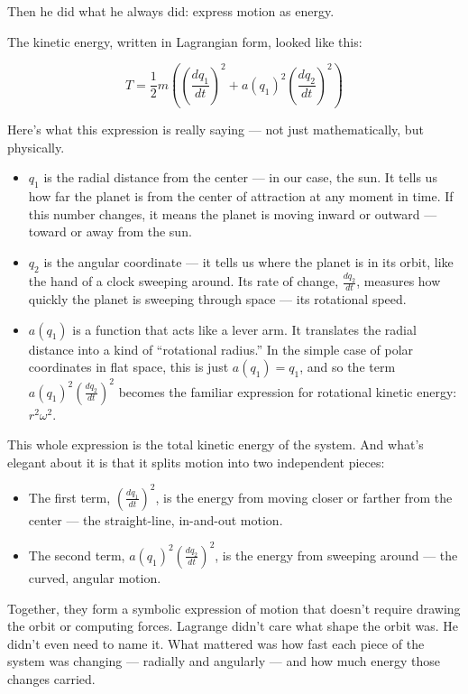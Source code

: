 Then he did what he always did: express motion as energy.

The kinetic energy, written in Lagrangian form, looked like this:

\[
T = \frac{1}{2} m \left( \left( \frac{dq_1}{dt} \right)^2 + a(q_1)^2 \left( \frac{dq_2}{dt} \right)^2 \right)
\]

Here’s what this expression is really saying — not just mathematically, but physically.

\begin{itemize}
    \item \( q_1 \) is the radial distance from the center — in our case, the sun. It tells us how far the planet is from the center of attraction at any moment in time. If this number changes, it means the planet is moving inward or outward — toward or away from the sun.
    
    \item \( q_2 \) is the angular coordinate — it tells us where the planet is in its orbit, like the hand of a clock sweeping around. Its rate of change, \( \frac{dq_2}{dt} \), measures how quickly the planet is sweeping through space — its rotational speed.
    
    \item \( a(q_1) \) is a function that acts like a lever arm. It translates the radial distance into a kind of “rotational radius.” In the simple case of polar coordinates in flat space, this is just \( a(q_1) = q_1 \), and so the term \( a(q_1)^2 \left( \frac{dq_2}{dt} \right)^2 \) becomes the familiar expression for rotational kinetic energy: \( r^2 \omega^2 \).
\end{itemize}

This whole expression is the total kinetic energy of the system. And what’s elegant about it is that it splits motion into two independent pieces:

\begin{itemize}
    \item The first term, \( \left( \frac{dq_1}{dt} \right)^2 \), is the energy from moving closer or farther from the center — the straight-line, in-and-out motion.
    
    \item The second term, \( a(q_1)^2 \left( \frac{dq_2}{dt} \right)^2 \), is the energy from sweeping around — the curved, angular motion.
\end{itemize}

Together, they form a symbolic expression of motion that doesn’t require drawing the orbit or computing forces. Lagrange didn’t care what shape the orbit was. He didn’t even need to name it. What mattered was how fast each piece of the system was changing — radially and angularly — and how much energy those changes carried.

